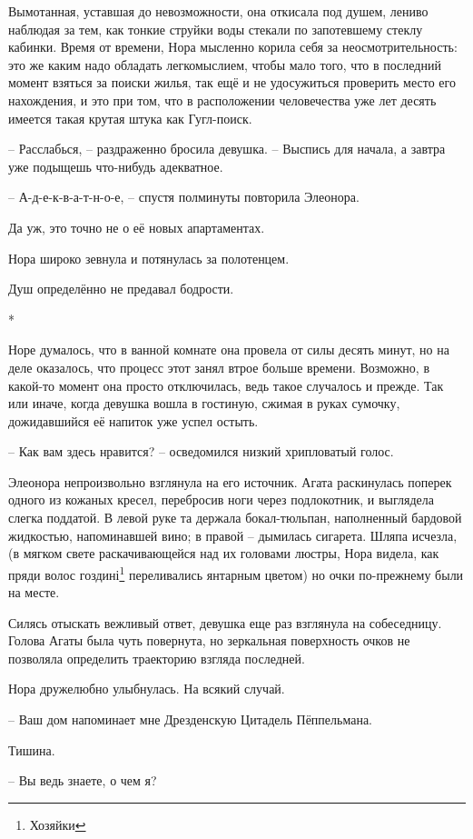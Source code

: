\documentclass[
  a5paperpaper,
  DIV=11,
  numbers=noendperiod]{scrreprt}
\begin{document}
Вымотанная, уставшая до невозможности, она откисала под душем, лениво
наблюдая за тем, как тонкие струйки воды стекали по запотевшему стеклу
кабинки. Время от времени, Нора мысленно корила себя за
неосмотрительность: это же каким надо обладать легкомыслием, чтобы мало
того, что в последний момент взяться за поиски жилья, так ещё и не
удосужиться проверить место его нахождения, и это при том, что в
расположении человечества уже лет десять имеется такая крутая штука как
Гугл-поиск.

-- Расслабься, -- раздраженно бросила девушка. -- Выспись для начала, а
завтра уже подыщешь что-нибудь адекватное.

-- А-д-е-к-в-а-т-н-о-е, -- спустя полминуты повторила Элеонора.

Да уж, это точно не о её новых апартаментах.

Нора широко зевнула и потянулась за полотенцем.

Душ определённо не предавал бодрости.

*

Норе думалось, что в ванной комнате она провела от силы десять минут, но
на деле оказалось, что процесс этот занял втрое больше времени.
Возможно, в какой-то момент она просто отключилась, ведь такое случалось
и прежде. Так или иначе, когда девушка вошла в гостиную, сжимая в руках
сумочку, дожидавшийся её напиток уже успел остыть.

-- Как вам здесь нравится? -- осведомился низкий хрипловатый голос.

Элеонора непроизвольно взглянула на его источник. Агата раскинулась
поперек одного из кожаных кресел, перебросив ноги через подлокотник, и
выглядела слегка поддатой. В левой руке та держала бокал-тюльпан,
наполненный бардовой жидкостью, напоминавшей вино; в правой -- дымилась
сигарета. Шляпа исчезла, (в мягком свете раскачивающейся над их головами
люстры, Нора видела, как пряди волос гоздині\footnote{Хозяйки}
переливались янтарным цветом) но очки по-прежнему были на месте.

Силясь отыскать вежливый ответ, девушка еще раз взглянула на
собеседницу. Голова Агаты была чуть повернута, но зеркальная поверхность
очков не позволяла определить траекторию взгляда последней.

Нора дружелюбно улыбнулась. На всякий случай.

-- Ваш дом напоминает мне Дрезденскую Цитадель Пёппельмана.

Тишина.

-- Вы ведь знаете, о чем я?
\end{document}
